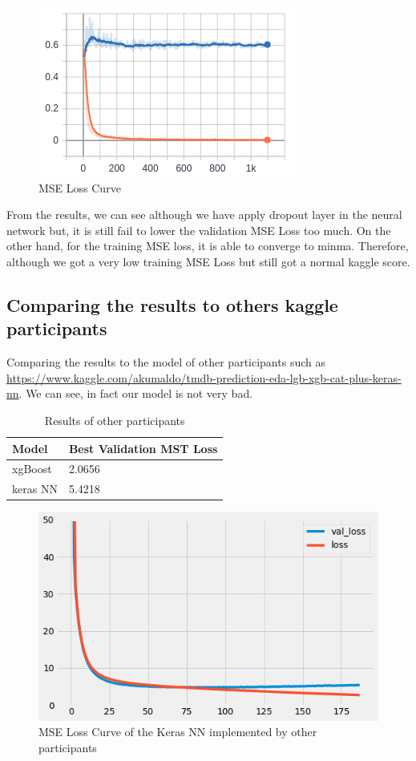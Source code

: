 \documentclass{article}
\begin{document}
\begin{figure}[h]
  \centering
  \includegraphics[scale=1]{learning_curve.png}
  \caption{MSE Loss Curve}
\end{figure}

From the results, we can see although we have apply dropout layer in the neural network but, it is still fail to lower the validation MSE Loss too much. On the other hand, for the training MSE loss, it is able to converge to minma. Therefore, although we got a very low training MSE Loss but still got a normal kaggle score.

\pagebreak

\subsection{Comparing the results to others kaggle participants}

Comparing the results to the model of other participants such as \url{https://www.kaggle.com/akumaldo/tmdb-prediction-eda-lgb-xgb-cat-plus-keras-nn}. We can see, in fact our model is not very bad. 

\begin{table}[htb]
	\caption{Results of other participants}
	\label{sample-table}
	\centering
	\begin{tabular}{ll}
		\toprule
		\cmidrule{1-2}
		Model & Best Validation MST Loss\\
		\midrule
		xgBoost & 2.0656   \\
		keras NN & 5.4218   \\
		\bottomrule
	\end{tabular}
\end{table}

\begin{figure}[h]
  \centering
  \includegraphics[scale=0.7]{other_curve.png}
  \caption{MSE Loss Curve of the Keras NN implemented by other participants}
\end{figure}
\end{document}
